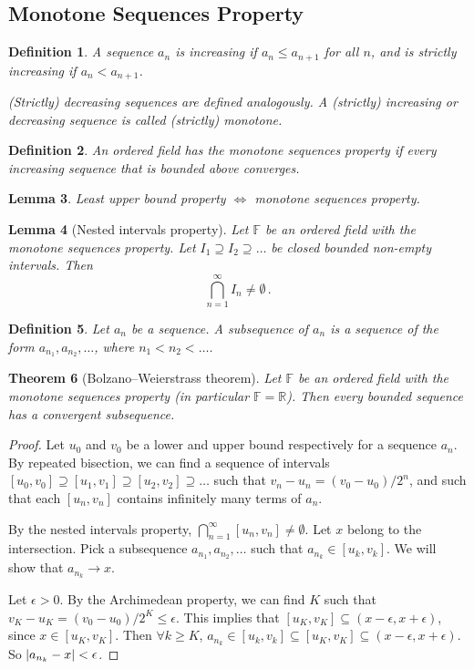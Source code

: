\documentclass{article}
\theoremstyle{plain}\theoremheaderfont{\normalfont\itshape}\theorembodyfont{\rmfamily}\theoremseparator{.}\newtheorem*{rem}{Remark}\newtheorem*{ex}{Example}\newtheorem*{proof}{Proof}\newtheorem*{altp}{Alternative proof}
\theoremstyle{plain}\theoremheaderfont{\normalfont\bfseries}\theorembodyfont{\rmfamily}\theoremseparator{.}\newtheorem{thm}{Theorem}[section]\newtheorem{lem}[thm]{Lemma}\newtheorem{prop}[thm]{Proposition}\newtheorem*{cor}{Corollary}\newtheorem{defn}[thm]{Definition}\newtheorem{clm}[thm]{Claim}\newtheorem{clminproof}{Claim}
\theoremstyle{break}\theoremheaderfont{\normalfont\itshape}\theorembodyfont{\rmfamily}\theoremseparator{.\medskip}\newtheorem*{proofskip}{Proof}\newtheorem*{exs}{Examples}\newtheorem*{rems}{Remarks}
\theoremstyle{break}\theoremheaderfont{\normalfont\bfseries}\theorembodyfont{\rmfamily}\theoremseparator{.\medskip}\newtheorem{lemskip}[thm]{Lemma}\newtheorem{defnskip}[thm]{Definition}\newtheorem{propskip}[thm]{Proposition}\newtheorem{thmskip}[thm]{Theorem}
\begin{document}
    \subsection{Monotone Sequences Property}
    \begin{defn}
        A sequence \(a_n\) is \textit{increasing} if \(a_n\le a_{n+1}\) for all \(n\), and is \textit{strictly increasing} if \(a_n<a_{n+1}\).

        \textit{(Strictly) decreasing} sequences are defined analogously. A (strictly) increasing or decreasing sequence is called \textit{(strictly) monotone}.
    \end{defn}
    \begin{defn}
        An ordered field has the \textit{monotone
        sequences property} if every increasing sequence that is bounded above converges.
    \end{defn}
    \begin{lem}
        Least upper bound property \(\iff\) monotone sequences property.
    \end{lem}
    \begin{lem}[Nested intervals property] Let \(\mathbb{F}\) be an ordered field with the monotone sequences property. Let \(I_1\supseteq I_2\supseteq\dots\) be closed bounded non-empty intervals. Then
        \[\bigcap_{n=1}^{\infty}I_n\ne\emptyset\,.\]
    \end{lem}
    \begin{defn}
        Let \(a_n\) be a sequence. A \textit{subsequence} of \(a_n\) is a sequence of the form \(a_{n_1},a_{n_2},\dots\), where \(n_1<n_2<\dots\).
    \end{defn}
    \begin{thm}[Bolzano--Weierstrass theorem]
        Let \(\mathbb{F}\) be an ordered field with the monotone sequences property (in particular \(\mathbb{F}=\mathbb{R}\)). Then every bounded sequence has a convergent subsequence.
    \end{thm}
    \begin{proof}
        Let \(u_0\) and \(v_0\) be a lower and upper bound respectively for a sequence \(a_n\). By repeated bisection, we can find a sequence of intervals \([u_0,v_0]\supseteq [u_1,v_1]\supseteq [u_2,v_2]\supseteq\dots\) such that \(v_n-u_n=(v_0-u_0)/2^n\), and such that each \([u_n,v_n]\) contains infinitely many terms of \(a_n\).

        By the nested intervals property, \(\bigcap_{n=1}^{\infty}[u_n,v_n]\ne\emptyset\). Let \(x\) belong to the intersection. Pick a subsequence \(a_{n_1},a_{n_2},\dots\) such that \(a_{n_k}\in [u_k,v_k]\). We will show that \(a_{n_k}\to x\).

        Let \(\epsilon>0\). By the Archimedean property, we can find \(K\) such that \(v_K-u_K=(v_0-u_0)/2^K\le\epsilon\). This implies that \([u_K,v_K]\subseteq (x-\epsilon,x+\epsilon)\), since \(x\in[u_K,v_K]\). Then \(\forall k\ge K\), \(a_{n_k}\in[u_k,v_k]\subseteq[u_K,v_K]\subseteq (x-\epsilon,x+\epsilon)\). So \(\abs{a_{n_k}-x}<\epsilon\).
    \end{proof}
\end{document}
